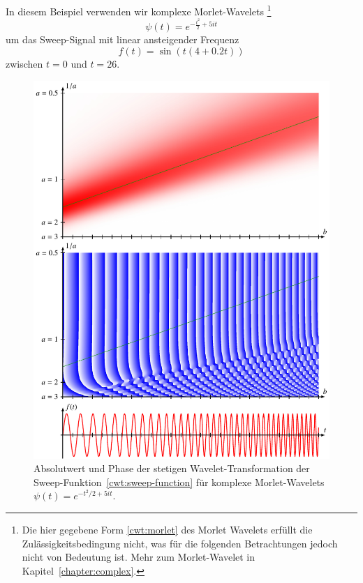 \begin{beispiel}
In diesem Beispiel verwenden wir komplexe Morlet-Wavelets%
\footnote{Die hier gegebene Form \eqref{cwt:morlet} des Morlet Wavelets
erfüllt die Zulässigkeitsbedingung nicht, was für die folgenden 
Betrachtungen jedoch nicht von Bedeutung ist.
Mehr zum Morlet-Wavelet in Kapitel~\ref{chapter:complex}.}
\begin{equation}
\psi(t) = e^{-\frac{t^2}2 +5it}
\label{cwt:morlet}
\end{equation}
um das Sweep-Signal mit linear ansteigender Frequenz
\begin{equation}
f(t)
=
\sin(t(4+0.2t))
\label{cwt:sweep-function}
\end{equation}
zwischen $t=0$ und $t=26$.
\begin{figure}
\centering
\includegraphics[width=\hsize]{chapters/4-cwt/images/sweep2.pdf}
\caption{Absolutwert und Phase der stetigen Wavelet-Transformation
der Sweep-Funktion~\eqref{cwt:sweep-function} 
für komplexe Morlet-Wavelets $\psi(t) = e^{-t^2/2+5it}$.
\label{cwt:sweep-cwt-abs-phase}}

\end{figure}
\end{beispiel}
